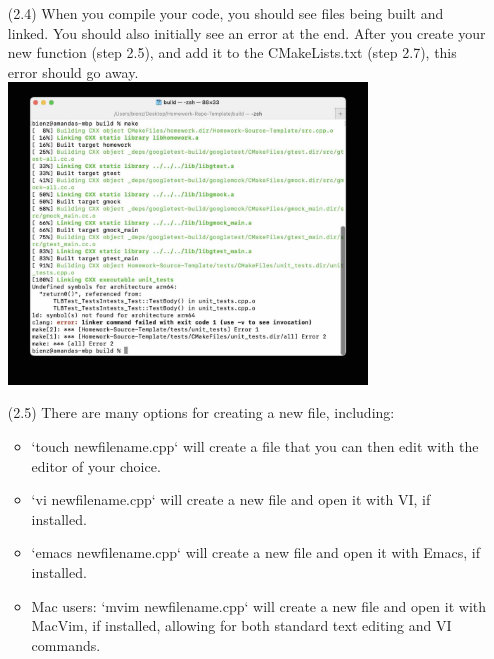 \documentclass{article} %
\begin{document}
\begin{enumerate}
    \item [(2.4)] When you compile your code, you should see files being built and linked.  You should also initially see an error at the end.  After you create your new function (step 2.5), and add it to the CMakeLists.txt (step 2.7), this error should go away.\\
    \includegraphics[width=0.75\textwidth]{figs/7_compile.jpg}

    \item [(2.5)] There are many options for creating a new file, including:
    \begin{itemize}
        \item `touch newfilename.cpp` will create a file that you can then edit with the editor of your choice.
        \item `vi newfilename.cpp` will create a new file and open it with VI, if installed.
        \item `emacs newfilename.cpp` will create a new file and open it with Emacs, if installed.
        \item Mac users: `mvim newfilename.cpp` will create a new file and open it with MacVim, if installed, allowing for both standard text editing and VI commands.
    \end{itemize}


\end{enumerate}
\end{document}
